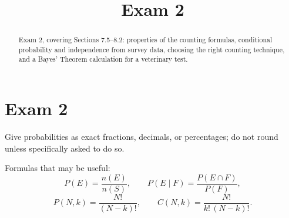 \documentclass[12pt]{ximera}
\title{Exam 2}
\begin{document}
\begin{abstract}
Exam 2, covering Sections 7.5--8.2: properties of the counting formulas, conditional
probability and independence from survey data, choosing the right counting technique,
and a Bayes' Theorem calculation for a veterinary test.
\end{abstract}
\maketitle

\section*{Exam 2}

Give probabilities as exact fractions, decimals, or percentages; do not round unless
specifically asked to do so.

Formulas that may be useful:
\[
P(E)=\frac{n(E)}{n(S)}, \qquad P(E\mid F)=\frac{P(E\cap F)}{P(F)},
\]
\[
P(N,k)=\frac{N!}{(N-k)!}, \qquad C(N,k)=\frac{N!}{k!\,(N-k)!}.
\]
\end{document}
